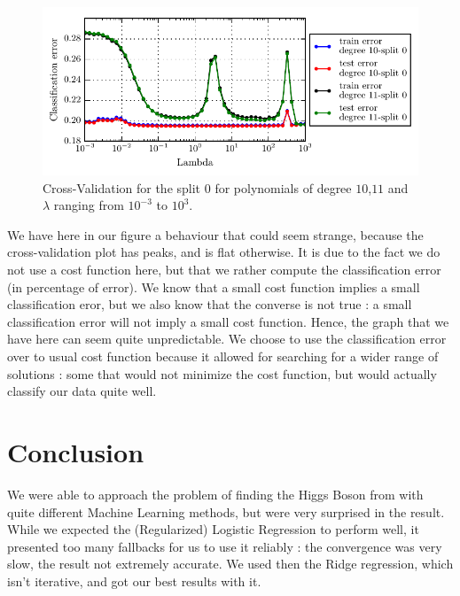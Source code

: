 \documentclass[10pt,conference,compsocconf]{IEEEtran}
\begin{document}
\begin{figure}[!ht]
	\centering
	\includegraphics[scale=.7]{Cross_validation_10_11}
	\caption{Cross-Validation for the split $0$ for polynomials of degree $10$,$11$ and $\lambda$ ranging from $10^{-3}$ to $10^3$.}
	\label{fig:cross-validation}
\end{figure}

We have here in our figure a behaviour that could seem strange, because the cross-validation plot has peaks, and is flat otherwise. It is due to the fact we do not use a cost function here, but that we rather compute the classification error (in percentage of error). We know that a small cost function implies a small classification eror, but we also know that the converse is not true : a small classification error will not imply a small cost function. Hence, the graph that we have here can seem quite unpredictable. We choose to use the classification error over to usual cost function because it allowed for searching for a wider range of solutions : some that would not minimize the cost function, but would actually classify our data quite well.
\section{Conclusion}
We were able to approach the problem of finding the Higgs Boson from with quite different Machine Learning methods, but were very surprised in the result. While we expected the (Regularized) Logistic Regression to perform well, it presented too many fallbacks for us to use it reliably : the convergence was very slow, the result not extremely accurate. We used then the Ridge regression, which isn't iterative, and got our best results with it.
\end{document}
